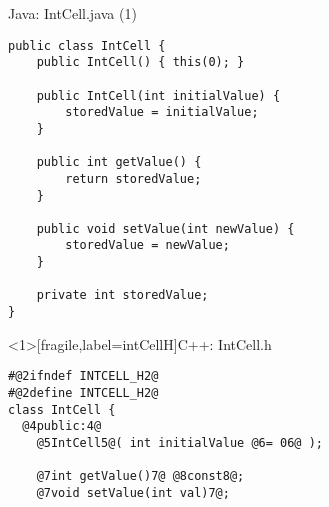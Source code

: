 \begin{frame}[fragile,label=cppClass]{Java: IntCell.java (1)}
\lstset{language=Java,style=smaller}
\begin{lstlisting}
public class IntCell {
    public IntCell() { this(0); }

    public IntCell(int initialValue) {
        storedValue = initialValue;
    }

    public int getValue() {
        return storedValue;
    }

    public void setValue(int newValue) {
        storedValue = newValue;
    }

    private int storedValue;
}
\end{lstlisting}
\end{frame}

\begin{frame}<1>[fragile,label=intCellH]{C++: IntCell.h}
\begin{lstlisting}
#@2ifndef INTCELL_H2@
#@2define INTCELL_H2@
class IntCell {
  @4public:4@
    @5IntCell5@( int initialValue @6= 06@ );

    @7int getValue()7@ @8const8@;
    @7void setValue(int val)7@;


\end{lstlisting}
\end{frame}
